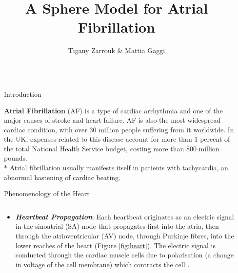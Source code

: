 \documentclass[final,hyperref={pdfpagelabels=false}]{beamer}
\title{\huge A Sphere Model for Atrial Fibrillation} %
\author{Tigany Zarrouk \& Mattia Gaggi } %
\institute{Supervisor: Kim Christensen.  Condensed Matter Theory Group---Imperial College London} %
\begin{document}

\begin{frame}[t] %

\begin{columns}[t] %

\begin{column}{.02\textwidth}\end{column} %

\begin{column}{.465\textwidth} %




            
\begin{block}{Introduction}


\textbf{Atrial Fibrillation} (AF) is a type of cardiac arrhythmia and one of the major causes of stroke and heart failure. AF is also the most widespread cardiac condition, with over 30 million people suffering from it worldwide. In the UK, expenses related to this disease account for more than 1 percent of the total National Health Service budget, costing more than 800 million pounds.\\*
 Atrial fibrillation usually manifests itself in patients with tachycardia, an abnormal hastening of cardiac beating.\\



\end{block}


\begin{block}{Phenomenology of the Heart}

\begin{columns}
\begin{column}{.54\textwidth}
	\begin{itemize}
	\item \textbf{\textit{Heartbeat Propagation}}: Each heartbeat originates as an electric signal in the sinoatrial (SA) node that propagates first into the atria, then through the atrioventricular (AV) node, through Purkinje fibres, into the lower reaches of the heart (Figure \ref{fig:heart}). The electric signal is conducted through the cardiac muscle cells due to polarisation (a change in voltage of the cell membrane) which contracts the cell \cite{Comtois}. 
	\end{itemize}
\end{column}


\end{columns}
\end{block}
\end{column}
\end{columns}
\end{frame}
\end{document}
